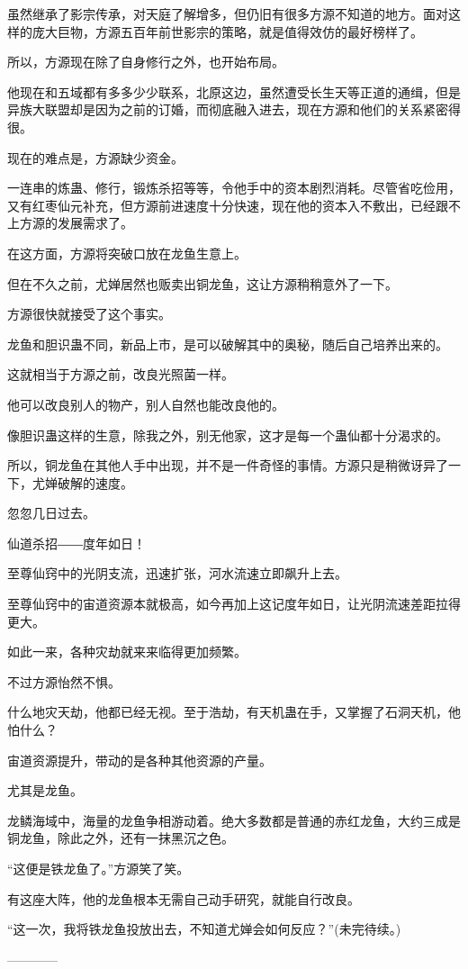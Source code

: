 \begin{this_body}
虽然继承了影宗传承，对天庭了解增多，但仍旧有很多方源不知道的地方。面对这样的庞大巨物，方源五百年前世影宗的策略，就是值得效仿的最好榜样了。

所以，方源现在除了自身修行之外，也开始布局。

他现在和五域都有多多少少联系，北原这边，虽然遭受长生天等正道的通缉，但是异族大联盟却是因为之前的订婚，而彻底融入进去，现在方源和他们的关系紧密得很。

现在的难点是，方源缺少资金。

一连串的炼蛊、修行，锻炼杀招等等，令他手中的资本剧烈消耗。尽管省吃俭用，又有红枣仙元补充，但方源前进速度十分快速，现在他的资本入不敷出，已经跟不上方源的发展需求了。

在这方面，方源将突破口放在龙鱼生意上。

但在不久之前，尤婵居然也贩卖出铜龙鱼，这让方源稍稍意外了一下。

方源很快就接受了这个事实。

龙鱼和胆识蛊不同，新品上市，是可以破解其中的奥秘，随后自己培养出来的。

这就相当于方源之前，改良光照菌一样。

他可以改良别人的物产，别人自然也能改良他的。

像胆识蛊这样的生意，除我之外，别无他家，这才是每一个蛊仙都十分渴求的。

所以，铜龙鱼在其他人手中出现，并不是一件奇怪的事情。方源只是稍微讶异了一下，尤婵破解的速度。

忽忽几日过去。

仙道杀招――度年如日！

至尊仙窍中的光阴支流，迅速扩张，河水流速立即飙升上去。

至尊仙窍中的宙道资源本就极高，如今再加上这记度年如日，让光阴流速差距拉得更大。

如此一来，各种灾劫就来来临得更加频繁。

不过方源怡然不惧。

什么地灾天劫，他都已经无视。至于浩劫，有天机蛊在手，又掌握了石洞天机，他怕什么？

宙道资源提升，带动的是各种其他资源的产量。

尤其是龙鱼。

龙鳞海域中，海量的龙鱼争相游动着。绝大多数都是普通的赤红龙鱼，大约三成是铜龙鱼，除此之外，还有一抹黑沉之色。

“这便是铁龙鱼了。”方源笑了笑。

有这座大阵，他的龙鱼根本无需自己动手研究，就能自行改良。

“这一次，我将铁龙鱼投放出去，不知道尤婵会如何反应？”(未完待续。)

------------

\end{this_body}

